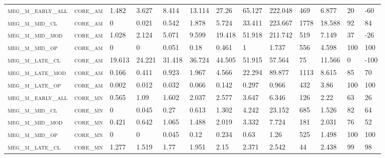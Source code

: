 \begin{landscape}
\begin{center}
\begin{footnotesize}
\begin{longtable}{lllllllllllll}
\textsc{meg\_m\_early\_all} & \textsc{core\_am  }   & 1.482    & 3.627    & 8.414    & 13.114   & 27.26    & 65.127   & 222.048  & 469    & 6.877         & 20            & -60             \\
\textsc{meg\_m\_mid\_cl   } & \textsc{core\_am  }   & 0        & 0.021    & 0.542    & 1.878    & 5.724    & 33.411   & 223.667  & 1778   & 18.588        & 92            & 84              \\
\textsc{meg\_m\_mid\_mod  } & \textsc{core\_am  }   & 1.028    & 2.124    & 5.071    & 9.599    & 19.418   & 51.918   & 211.742  & 519    & 7.149         & 37            & -26             \\
\textsc{meg\_m\_mid\_op   } & \textsc{core\_am  }   & 0        & 0        & 0.051    & 0.18     & 0.461    & 1        & 1.737    & 556    & 4.598         & 100           & 100             \\
\textsc{meg\_m\_late\_cl  } & \textsc{core\_am  }   & 19.613   & 24.221   & 31.418   & 36.724   & 44.505   & 51.915   & 57.564   & 75     & 11.566        & 0             & -100            \\
\textsc{meg\_m\_late\_mod } & \textsc{core\_am  }   & 0.166    & 0.411    & 0.923    & 1.967    & 4.566    & 22.294   & 89.877   & 1113   & 8.615         & 85            & 70              \\
\textsc{meg\_m\_late\_op  } & \textsc{core\_am  }   & 0.002    & 0.012    & 0.032    & 0.066    & 0.142    & 0.297    & 0.966    & 432    & 3.86          & 100           & 100             \\
\textsc{meg\_m\_early\_all} & \textsc{core\_mn  }   & 0.565    & 1.09     & 1.602    & 2.037    & 2.577    & 3.647    & 6.346    & 126    & 2.22          & 63            & 26              \\
\textsc{meg\_m\_mid\_cl   } & \textsc{core\_mn  }   & 0        & 0.045    & 0.27     & 0.613    & 1.302    & 4.242    & 23.152   & 685    & 1.526         & 82            & 64              \\
\textsc{meg\_m\_mid\_mod  } & \textsc{core\_mn  }   & 0.421    & 0.642    & 1.065    & 1.488    & 2.019    & 3.332    & 7.724    & 181    & 2.031         & 76            & 52              \\
\textsc{meg\_m\_mid\_op   } & \textsc{core\_mn  }   & 0        & 0        & 0.045    & 0.12     & 0.234    & 0.63     & 1.26     & 525    & 1.498         & 100           & 100             \\
\textsc{meg\_m\_late\_cl  } & \textsc{core\_mn  }   & 1.277    & 1.519    & 1.77     & 1.951    & 2.15     & 2.371    & 2.542    & 44     & 2.438         & 99            & 98              \\

\end{longtable}
\end{footnotesize}
\end{center}
\end{landscape}
